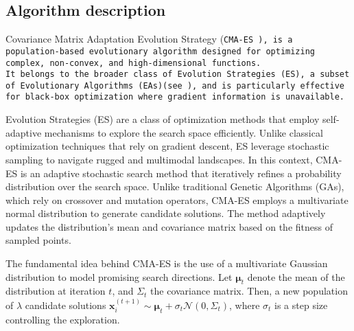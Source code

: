 \subsection{Algorithm description}
Covariance Matrix Adaptation Evolution Strategy (\tt{CMA-ES} \cite{cmaessimplepractical}), is a population-based evolutionary algorithm designed for optimizing complex, non-convex, and high-dimensional functions.\\
It belongs to the broader class of Evolution Strategies (ES), a subset of Evolutionary Algorithms (EAs)(see \cite{sloss20192019evolutionaryalgorithmsreview}), and is particularly effective for black-box optimization where gradient information is unavailable.

Evolution Strategies (ES) are a class of optimization methods that employ self-adaptive mechanisms to explore the search space efficiently. 
Unlike classical optimization techniques that rely on gradient descent, ES leverage stochastic sampling to navigate rugged and multimodal landscapes.
In this context, CMA-ES is an adaptive stochastic search method that iteratively refines a probability distribution over the search space. 
Unlike traditional Genetic Algorithms (GAs), which rely on crossover and mutation operators, CMA-ES employs a multivariate normal distribution to generate candidate solutions. 
The method adaptively updates the distribution's mean and covariance matrix based on the fitness of sampled points.

The fundamental idea behind CMA-ES is the use of a multivariate Gaussian distribution to model promising search directions. 
Let $\mathbf{\mu}_t$ denote the mean of the distribution at iteration $t$, and $\Sigma_t$ the covariance matrix. 
Then, a new population of $\lambda$ candidate solutions $\mathbf{x}_i^(t+1) \sim \mathbf{\mu}_t + \sigma_t\mathcal{N}(0, \Sigma_t)$, where $\sigma_t$ is a step size controlling the exploration.  

